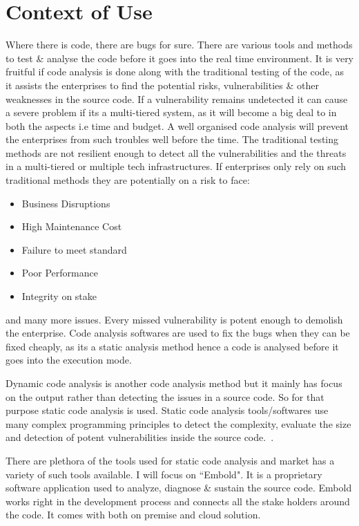 \section{Context of Use}
	Where there is code, there are bugs for sure. There are various tools and methods to test \& analyse the code before it goes into the real time environment. It is very fruitful if code analysis is done along with the traditional testing of the code, as it assists the enterprises to find the potential risks, vulnerabilities \& other weaknesses in the source code. If a vulnerability remains undetected it can cause a severe problem if its a multi-tiered system, as it will become a big deal to in both the aspects i.e time and budget. A well organised code analysis will prevent the enterprises from such troubles well before the time. 
	The traditional testing methods are not resilient enough to detect all the vulnerabilities and the threats in a multi-tiered or multiple tech infrastructures. If enterprises only rely on such traditional methods they are potentially on a risk to face:
	\begin{itemize}
	\item Business Disruptions
	\item High Maintenance Cost
	\item Failure to meet standard
	\item Poor Performance
	\item Integrity on stake
	\end{itemize}
and many more issues. Every missed vulnerability is potent enough to demolish the enterprise. Code analysis softwares are used to fix the bugs when they can be fixed cheaply, as its a static analysis method hence a code is analysed before it goes into the execution mode. \par
Dynamic code analysis is another code analysis method but it mainly has focus on the output rather than detecting the issues in a source code. So for that purpose static code analysis is used. Static code analysis tools/softwares use many complex programming principles to detect the complexity, evaluate the size and detection of potent vulnerabilities inside the source code.~\cite{Embold}. \par
There are plethora of the tools used for static code analysis and market has a variety of such tools available. I will focus on ``Embold". It is a proprietary software application used to analyze, diagnose \& sustain the source code. Embold works right in the development process and connects all the stake holders around the code. It comes with both on premise and cloud solution. \par
